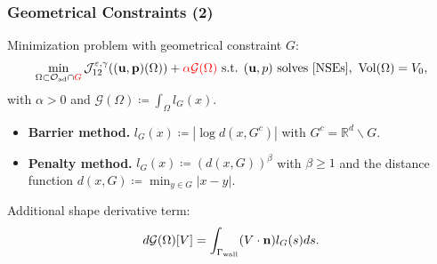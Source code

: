 \documentclass[10pt,xcolor=table,english]{beamer}   %
\begin{document}
\begin{frame}
    \frametitle{Geometrical Constraints (2)}
    Minimization problem with {\color{red} geometrical constraint $G$}:
    \begin{align*}
    \min_{\Omega\subset\mathcal{O}_{\rm ad}\cap{\color{red}G}} \mathcal{J}_{12}^{\varepsilon,\gamma}(({\bf u,p})(\Omega)) + {\color{red} \alpha\mathcal{G}(\Omega)} \mbox{ s.t. } ({\bf u},p) \mbox{ solves \eqref{NSEs}},\ {\rm Vol}(\Omega) = V_0,
    \end{align*}
    with $\alpha > 0$ and $\mathcal{G}(\Omega)\coloneqq \int_\Omega l_G(x)$.
    \begin{itemize}
        \item \textbf{Barrier method.} $l_G(x)\coloneqq |\log d(x,G^c)|$ with $G^c = \mathbb{R}^d\backslash G$.
        \smallskip
        \item \textbf{Penalty method.} $l_G(x)\coloneqq (d(x,G))^\beta$ with $\beta\ge 1$ and the distance function $d(x,G)\coloneqq \min_{y\in G}|x - y|$.
    \end{itemize}
    \smallskip
    Additional shape derivative term:
    \begin{align*}
    d\mathcal{G}(\Omega)[V] = \int_{\Gamma_{\rm wall}} (V\cdot{\bf n})l_G(s)ds.
    \end{align*}
\end{frame}
\end{document}
